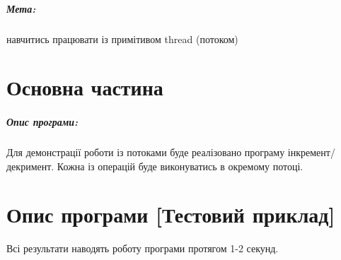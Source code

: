 \documentclass{udstu}
\begin{document}

\tableofcontents

\intro

\paragraph{\textbf{Мета:}} навчитись працювати із примітивом thread (потоком)

\chapter{Основна частина}
\label{chap:1}

\paragraph{\textbf{Опис програми:}}

Для демонстрації роботи із потоками буде реалізовано програму інкремент/декримент.
Кожна із операцій буде виконуватись в окремому потоці.


\chapter{Опис програми [Тестовий приклад]}
\label{chap:3}

Всі результати наводять роботу програми протягом 1-2 секунд.
\end{document}
